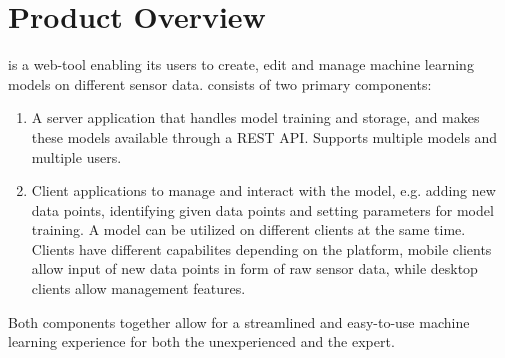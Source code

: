 \section{Product Overview}

 {\pseProjectName} is a web-tool enabling its users to create, edit and manage machine learning models on different sensor data. {\pseProjectName} consists of two primary components:

\begin{enumerate}
    \item A server application that handles model training and storage, and makes these models available through a REST API. Supports multiple models and multiple users.
    \item Client applications to manage and interact with the model, e.g. adding new data points, identifying given data points and setting parameters for model training. A model can be utilized on different clients at the same time. Clients have different capabilites depending on the platform, mobile clients allow input of new data points in form of raw sensor data, while desktop clients allow management features.
\end{enumerate} %

Both components together allow for a streamlined and easy-to-use machine learning experience for both the unexperienced and the expert.
